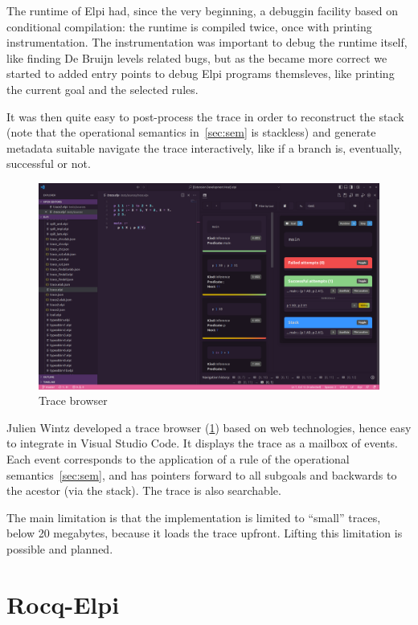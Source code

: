 \documentclass[a4paper, 11pt]{book}
\begin{document}
The runtime of Elpi had, since the very beginning, a debuggin facility based
on conditional compilation: the runtime is compiled twice, once with
printing instrumentation. The instrumentation was important to debug the
runtime itself, like finding De Bruijn levels related bugs, but as the
became more correct we started to added entry points to debug Elpi programs
themsleves, like printing the current goal and the selected rules.

It was then quite easy to post-process the trace in order to reconstruct
the stack (note that the operational semantics in~\cref{sec:sem} is stackless)
and generate metadata suitable navigate the trace interactively, like
if a branch is, eventually, successful or not.

\begin{figure}
    \includegraphics[width=.9\textwidth]{elpi-tracer}
    \caption{Trace browser\label{fig:trace}}
\end{figure}

Julien Wintz developed a trace browser (\cref{fig:trace}) based on web technologies, hence
easy to integrate in Visual Studio Code. It displays the trace as a mailbox
of events. Each event corresponds to the application of a rule of
the operational semantics~\cref{sec:sem}, and has pointers forward to
all subgoals and backwards to the acestor (via the stack).
The trace is also searchable.

The main limitation is that the implementation is limited to ``small''
traces, below 20 megabytes, because it loads the trace upfront.
Lifting this limitation is possible and planned.

\chapter{Rocq-Elpi}\label{sec:rocq}
\end{document}
